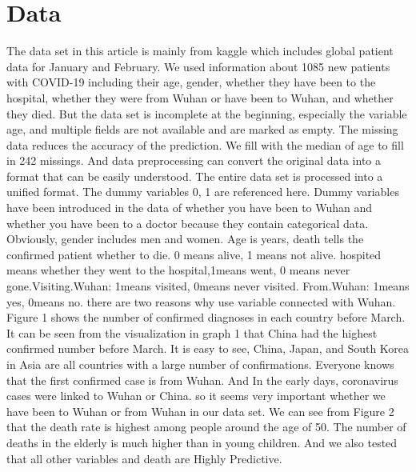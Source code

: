 \documentclass[12pt,english]{article}
\begin{document}
\section{Data}
The data set in this article is mainly from kaggle which includes global patient data for January and February. We used information about 1085 new patients with COVID-19 including their age, gender, whether they have been to the hospital, whether they were from Wuhan or have been to Wuhan, and whether they died. 
But the data set is incomplete at the beginning, especially the variable age, and multiple fields are not available and are marked as empty. The missing data reduces the accuracy of the prediction. We fill with the median of age to fill in 242 missings. 
And data preprocessing can convert the original data into a format that can be easily understood. The entire data set is processed into a unified format. The dummy variables 0, 1 are referenced here. Dummy variables have been introduced in the data of whether you have been to Wuhan and whether you have been to a doctor because they contain categorical data.
Obviously, gender includes men and women. Age is years, death tells the confirmed patient whether to die. 0 means alive, 1 means not alive. hospited means whether they went to the hospital,1means went, 0 means never gone.Visiting.Wuhan: 1means visited, 0means never visited. From.Wuhan: 1means yes, 0means no.
\newline
there are two reasons why use variable connected with Wuhan. Figure 1 shows the number of confirmed diagnoses in each country before March. It can be seen from the visualization in graph 1 that China had the highest confirmed number before March. It is easy to see, China, Japan, and South Korea in Asia are all countries with a large number of confirmations.
Everyone knows that the first confirmed case is from Wuhan. And In the early days, coronavirus cases were linked to Wuhan or China. so it seems very important whether we have been to Wuhan or from Wuhan in our data set. We can see from Figure 2 that the death rate is highest among people around the age of 50. The number of deaths in the elderly is much higher than in young children. And we also tested that all other variables and death are Highly Predictive.
\newline
\end{document}
